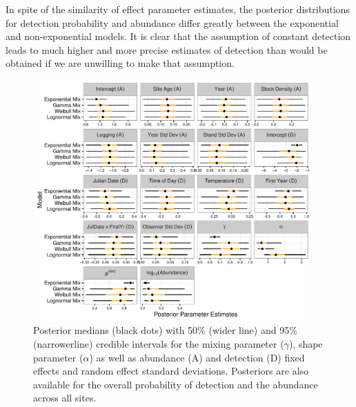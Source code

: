 \documentclass[12pt]{article}
\newif\ifdic   %
\begin{document}
\ifdic
DIC calculations preferred the exponential mixture TTDD to the lognormal, Weibull, and gamma mixtures (differences of 6.95, 10.7, and 11.5, respectively).  
These differences closely mirror those from the exponential mixture dataset in Sim3, but they also mirror those from the nonpeaked lognormal mixture dataset, where the exponential mixture 95\% credible interval for abundance did not contain the true value, and its posterior median was negatively biased by 18\% of the actual abundance.
\fi

In spite of the similarity of effect parameter estimates, the posterior distributions for detection probability and abundance differ greatly between the exponential and non-exponential models.  
It is clear that the assumption of constant detection leads to much higher and more precise estimates of detection than would be obtained if we are unwilling to make that assumption.



\begin{figure}[h!]\centering
\includegraphics[width=0.95\textwidth]{OVEN/oven_sum/OVEN_Posteriors}
\caption{\label{ovenposteriors} Posterior medians (black dots) with 50\% (wider line) and 95\% (narrowerline) credible intervals for the mixing parameter ($\gamma$), shape parameter ($\alpha$) as well as abundance (A) and detection (D) fixed effects and random effect standard deviations.
Posteriors are also available for the overall probability of detection and the abundance across all sites.}
\end{figure}
\end{document}
